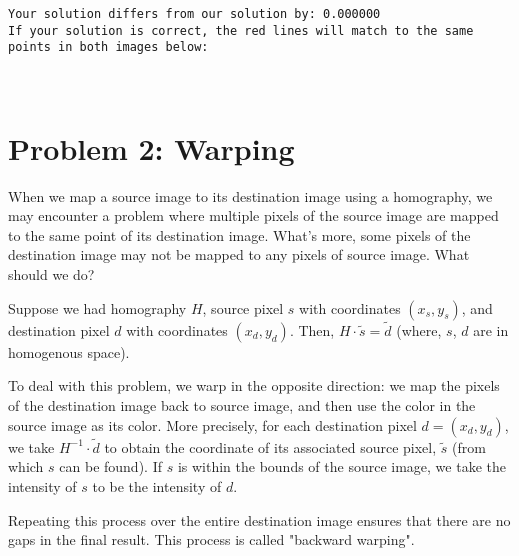 \documentclass[11pt]{article}
\begin{document}
    \begin{Verbatim}[commandchars=\\\{\}]
Your solution differs from our solution by: 0.000000
If your solution is correct, the red lines will match to the same points in both images below:

    \end{Verbatim}

    \begin{center}
    \end{center}
    { \hspace*{\fill} \\}
    
    \section{Problem 2: Warping}\label{problem-2-warping}

When we map a source image to its destination image using a homography,
we may encounter a problem where multiple pixels of the source image are
mapped to the same point of its destination image. What's more, some
pixels of the destination image may not be mapped to any pixels of
source image. What should we do?

Suppose we had homography \(H\), source pixel \(s\) with coordinates
\((x_s, y_s)\), and destination pixel \(d\) with coordinates
\((x_d, y_d)\). Then, \(H \cdot \tilde{s} = \tilde{d}\) (where, \(s\),
\(d\) are in homogenous space).

To deal with this problem, we warp in the opposite direction: we map the
pixels of the destination image back to source image, and then use the
color in the source image as its color. More precisely, for each
destination pixel \(d = (x_d, y_d)\), we take \(H^{-1} \cdot \tilde{d}\)
to obtain the coordinate of its associated source pixel, \(\tilde{s}\)
(from which \(s\) can be found). If \(s\) is within the bounds of the
source image, we take the intensity of \(s\) to be the intensity of
\(d\).

Repeating this process over the entire destination image ensures that
there are no gaps in the final result. This process is called "backward
warping".
\end{document}

